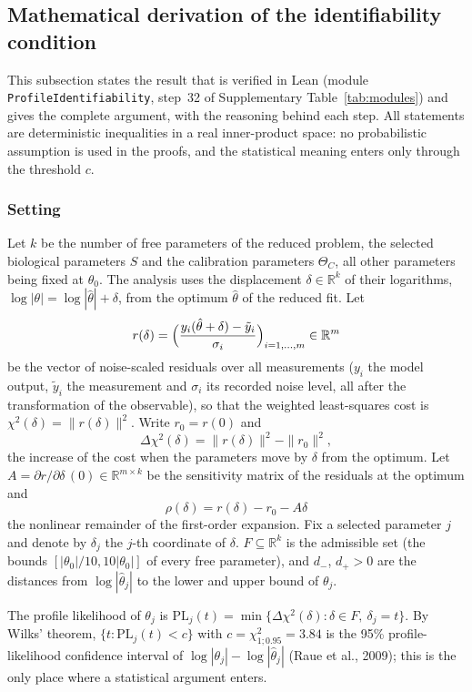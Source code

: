 \subsection*{Mathematical derivation of the identifiability condition}

This subsection states the result that is verified in Lean (module \texttt{ProfileIdentifiability}, step~32 of Supplementary Table~\ref{tab:modules}) and gives the complete argument, with the reasoning behind each step. All statements are deterministic inequalities in a real inner-product space: no probabilistic assumption is used in the proofs, and the statistical meaning enters only through the threshold $c$.

\subsubsection*{Setting}

Let $k$ be the number of free parameters of the reduced problem, the selected biological parameters $S$ and the calibration parameters $\Theta_C$, all other parameters being fixed at $\theta_0$. The analysis uses the displacement $\delta\in\mathbb{R}^k$ of their logarithms, $\log|\theta|=\log|\hat\theta|+\delta$, from the optimum $\hat\theta$ of the reduced fit. Let
\[ r(\delta)=\Bigl(\frac{y_i(\hat\theta+\delta)-\tilde y_i}{\sigma_i}\Bigr)_{i=1,\dots,m}\in\mathbb{R}^m \]
be the vector of noise-scaled residuals over all measurements ($y_i$ the model output, $\tilde y_i$ the measurement and $\sigma_i$ its recorded noise level, all after the transformation of the observable), so that the weighted least-squares cost is $\chi^2(\delta)=\|r(\delta)\|^2$. Write $r_0=r(0)$ and
\[ \Delta\chi^2(\delta)=\|r(\delta)\|^2-\|r_0\|^2 , \]
the increase of the cost when the parameters move by $\delta$ from the optimum. Let $A=\partial r/\partial\delta\,(0)\in\mathbb{R}^{m\times k}$ be the sensitivity matrix of the residuals at the optimum and
\[ \rho(\delta)=r(\delta)-r_0-A\delta \]
the nonlinear remainder of the first-order expansion. Fix a selected parameter $j$ and denote by $\delta_j$ the $j$-th coordinate of $\delta$. $F\subseteq\mathbb{R}^k$ is the admissible set (the bounds $[|\theta_0|/10,10|\theta_0|]$ of every free parameter), and $d_-$, $d_+>0$ are the distances from $\log|\hat\theta_j|$ to the lower and upper bound of $\theta_j$.

The profile likelihood of $\theta_j$ is $\mathrm{PL}_j(t)=\min\{\Delta\chi^2(\delta):\delta\in F,\ \delta_j=t\}$. By Wilks' theorem, $\{t:\mathrm{PL}_j(t)<c\}$ with $c=\chi^2_{1;0.95}=3.84$ is the 95\% profile-likelihood confidence interval of $\log|\theta_j|-\log|\hat\theta_j|$ (Raue et al., 2009); this is the only place where a statistical argument enters.

